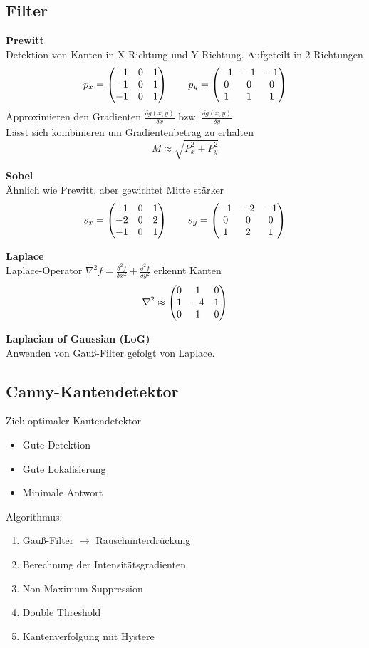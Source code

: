 \subsection{Filter}
\textbf{Prewitt}\\
Detektion von Kanten in X-Richtung und Y-Richtung. Aufgeteilt in 2 Richtungen
\[p_x = \begin{pmatrix}-1 & 0 & 1\\-1 & 0 & 1\\ -1 & 0 & 1\\\end{pmatrix} \qquad p_y = \begin{pmatrix}-1 & -1 & -1\\ 0 & 0 & 0\\ 1& 1 & 1\\\end{pmatrix}\]
Approximieren den Gradienten \(\frac{\delta g(x, y)}{\delta x}\) bzw. \(\frac{\delta g(x, y)}{\delta y}\)\\
Lässt sich kombinieren um Gradientenbetrag zu erhalten
\[M \approx \sqrt{P_x^2 + P_y^2}\]

\textbf{Sobel}\\
Ähnlich wie Prewitt, aber gewichtet Mitte stärker
\[s_x = \begin{pmatrix}-1 & 0 & 1\\-2 & 0 & 2\\ -1 & 0 & 1\\\end{pmatrix} \qquad s_y = \begin{pmatrix}-1 & -2 & -1\\ 0 & 0 & 0\\ 1& 2 & 1\\\end{pmatrix}\]

\textbf{Laplace}\\
Laplace-Operator \(\nabla^2 f= \frac{\delta^2 f}{\delta x^2}+ \frac{\delta^2 f}{\delta y^2}\) erkennt Kanten\\
\[\nabla^2 \approx \begin{pmatrix}0 & 1 & 0 \\ 1 & -4 & 1 \\ 0 & 1 & 0\end{pmatrix}\]

\textbf{Laplacian of Gaussian (LoG)}\\
Anwenden von Gauß-Filter gefolgt von Laplace.

\subsection{Canny-Kantendetektor}
Ziel: optimaler Kantendetektor
\begin{itemize}
\item Gute Detektion
\item Gute Lokalisierung
\item Minimale Antwort
\end{itemize}

Algorithmus:
\begin{enumerate}
\item Gauß-Filter \(\rightarrow\) Rauschunterdrückung
\item Berechnung der Intensitätsgradienten
\item Non-Maximum Suppression
\item Double Threshold
\item Kantenverfolgung mit Hystere
\end{enumerate}

